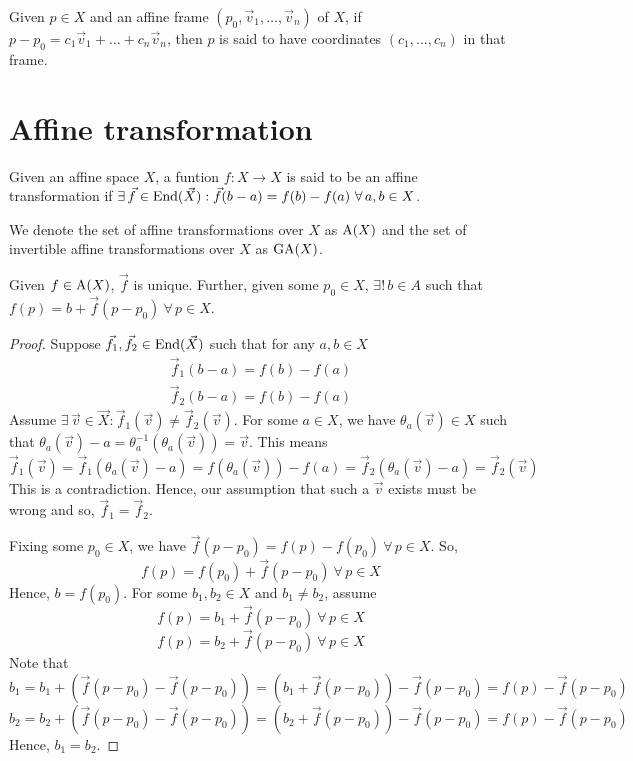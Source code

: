 \noindent
Given $p \in X$ and an affine frame $(p_0,\vec{v}_1,\dots,\vec{v}_n)$ of $X$, if
$p-p_0=c_1\vec{v}_1+\dots+c_n\vec{v}_n$, then $p$ is said to have coordinates
$(c_1,\dots,c_n)$ in that frame.

\section{Affine transformation}

\begin{definition}
    Given an affine space $X$, a funtion $f: X \to X$ is said to be an affine
    transformation if $\exists\,\vec{f}\in\operatorname{End}(\vec{X}): \vec{f}(b-a)=f(b)-f(a)\ \forall\,a,b \in X$.
\end{definition}

\begin{notation}
    We denote the set of affine transformations over $X$ as $\operatorname{A}(X)$ and the set of
    invertible affine transformations over $X$ as $\operatorname{GA}(X)$.
\end{notation}

\begin{theorem} \label{thm:aff_lin_rep}
    Given $f\in\operatorname{A}(X)$, $\vec{f}$ is unique. Further, given some $p_0 \in X$,
    $\exists!\,b\in{A}$ such that $f(p)=b+\vec{f}(p-p_0)\ \forall\,p \in X$.
\end{theorem}

\begin{proof}
    Suppose $\vec{f}_1,\vec{f}_2\in\operatorname{End}(\vec{X})$ such that for any $a,b \in X$
    \begin{align*}
        \vec{f}_1(b-a)=f(b)-f(a) \\
        \vec{f}_2(b-a)=f(b)-f(a)
    \end{align*}
    Assume $\exists\,\vec{v}\in\vec{X}: \vec{f}_1(\vec{v})\neq\vec{f}_2(\vec{v})$.
    For some $a \in X$, we have $\theta_a(\vec{v}) \in X$ such that
    $\theta_a(\vec{v})-a=\theta_a^{-1}(\theta_a(\vec{v}))=\vec{v}$. This means
    \[
        \vec{f}_1(\vec{v}) = \vec{f}_1(\theta_a(\vec{v})-a)
        = f(\theta_a(\vec{v}))-f(a)
        = \vec{f}_2(\theta_a(\vec{v})-a)= \vec{f}_2(\vec{v})
    \]
    This is a contradiction. Hence, our assumption that such a $\vec{v}$ exists
    must be wrong and so, $\vec{f}_1=\vec{f}_2$.
    \vspace{1ex}

    \noindent
    Fixing some $p_0 \in X$, we have
    $\vec{f}(p-p_0)=f(p)-f(p_0)\ \forall\,p \in X$. So,
    \[ f(p)=f(p_0)+\vec{f}(p-p_0)\ \forall\,p \in X \]
    Hence, $b=f(p_0)$. For some $b_1,b_2 \in X$ and $b_1 \neq b_2$, assume
    \[ f(p)=b_1+\vec{f}(p-p_0)\ \forall\,p \in X \]
    \[ f(p)=b_2+\vec{f}(p-p_0)\ \forall\,p \in X \]
    Note that
    \[ b_1=b_1+(\vec{f}(p-p_0)-\vec{f}(p-p_0))=(b_1+\vec{f}(p-p_0))-\vec{f}(p-p_0)=f(p)-\vec{f}(p-p_0) \]
    \[ b_2=b_2+(\vec{f}(p-p_0)-\vec{f}(p-p_0))=(b_2+\vec{f}(p-p_0))-\vec{f}(p-p_0)=f(p)-\vec{f}(p-p_0) \]
    Hence, $b_1=b_2$.
\end{proof}

